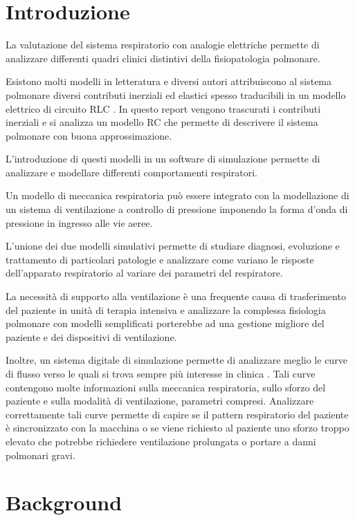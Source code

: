 \section{Introduzione}

La valutazione del sistema respiratorio con analogie elettriche permette di analizzare differenti quadri clinici distintivi della fisiopatologia polmonare. 

Esistono molti modelli in letteratura e diversi autori attribuiscono al sistema polmonare diversi contributi inerziali ed elastici spesso traducibili in un modello elettrico di circuito RLC \cite{ghafarian_review_nodate}. In questo report vengono trascurati i contributi inerziali e si analizza un modello RC che permette di descrivere il sistema polmonare con buona approssimazione. 

L'introduzione di questi modelli in un software di simulazione permette di analizzare e modellare differenti comportamenti respiratori. 

Un modello di meccanica respiratoria può essere integrato con la modellazione di un sistema di ventilazione a controllo di pressione imponendo la forma d'onda di pressione in ingresso alle vie aeree.

L'unione dei due modelli simulativi permette di studiare diagnosi, evoluzione e trattamento di particolari patologie e analizzare come variano le risposte dell'apparato respiratorio al variare dei parametri del respiratore.

La necessità di supporto alla ventilazione è una frequente causa di trasferimento del paziente in unità di terapia intensiva e analizzare la complessa fisiologia polmonare con modelli semplificati porterebbe ad una gestione migliore del paziente e dei dispositivi di ventilazione.

Inoltre, un sistema digitale di simulazione permette di analizzare meglio le curve di flusso verso le quali si trova sempre più interesse in clinica \cite{hamahata_go_2020}. Tali curve contengono molte informazioni sulla meccanica respiratoria, sullo sforzo del paziente e sulla modalità di ventilazione, parametri compresi. Analizzare correttamente tali curve permette di capire se il pattern respiratorio del paziente è sincronizzato con la macchina o se viene richiesto al paziente uno sforzo troppo elevato che potrebbe richiedere ventilazione prolungata o portare a danni polmonari gravi.

\section{Background}

